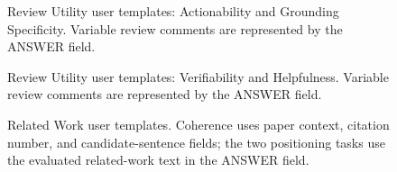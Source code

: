 \begin{figure}[p]
\begin{minipage}[t]{0.49\textwidth}
\end{minipage}\hfill
\begin{minipage}[t]{0.49\textwidth}
\end{minipage}
\caption{Review Utility user templates: Actionability and Grounding
Specificity. Variable review comments are represented by the ANSWER field.}
\label{fig:user-ru-actionability}
\label{fig:user-ru-grounding}
\end{figure}

\begin{figure}[p]
\begin{minipage}[t]{0.49\textwidth}
\end{minipage}\hfill
\begin{minipage}[t]{0.49\textwidth}
\end{minipage}
\caption{Review Utility user templates: Verifiability and Helpfulness.
Variable review comments are represented by the ANSWER field.}
\label{fig:user-ru-verifiability}
\label{fig:user-ru-helpfulness}
\end{figure}

\begin{figure}[p]
\begin{minipage}[t]{0.49\textwidth}
\end{minipage}\hfill
\begin{minipage}[t]{0.49\textwidth}
\vspace{0.45em}
\end{minipage}
\caption{Related Work user templates. Coherence uses paper context, citation
number, and candidate-sentence fields; the two positioning tasks use the
evaluated related-work text in the ANSWER field.}
\label{fig:user-rw-coherence}
\label{fig:user-rw-coh-p1}
\label{fig:user-rw-coh-p2}
\label{fig:user-rw-pos-type}
\label{fig:user-rw-pos-check}
\end{figure}

